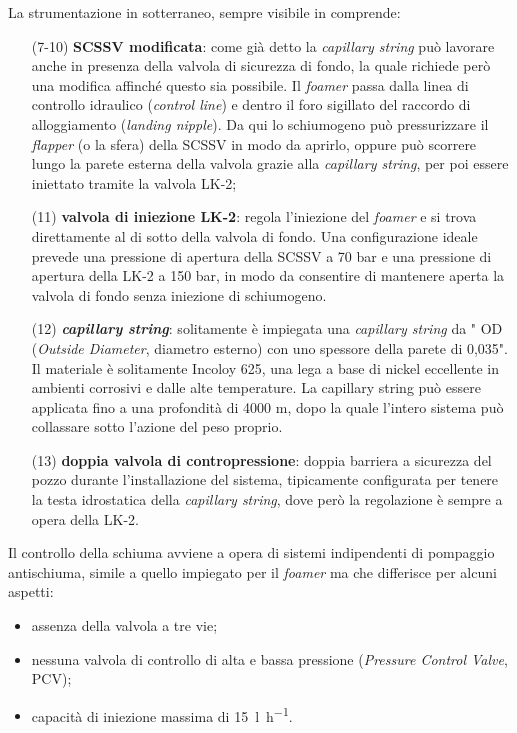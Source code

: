 La strumentazione in sotterraneo, sempre visibile in  comprende:
\begin{itemize}
    \item[(7-10)] \textbf{SCSSV modificata}: come già detto la \textit{capillary string} può lavorare anche in presenza della valvola di sicurezza di fondo, la quale richiede però una modifica affinché questo sia possibile. Il \textit{foamer} passa dalla linea di controllo idraulico (\textit{control line}) e dentro il foro sigillato del raccordo di alloggiamento (\textit{landing nipple}). Da qui lo schiumogeno può pressurizzare il \textit{flapper} (o la sfera) della SCSSV in modo da aprirlo, oppure può scorrere lungo la parete esterna della valvola grazie alla \textit{capillary string}, per poi essere iniettato tramite la valvola LK-2;
    \item[(11)] \textbf{valvola di iniezione LK-2}: regola l'iniezione del \textit{foamer} e si trova direttamente al di sotto della valvola di fondo. Una configurazione ideale prevede una pressione di apertura della SCSSV a 70 bar e una pressione di apertura della LK-2 a 150 bar, in modo da consentire di mantenere aperta la valvola di fondo senza iniezione di schiumogeno.
    \item[(12)] \textit{\textbf{capillary string}}: solitamente è impiegata una \textit{capillary string} da {}" OD (\textit{Outside Diameter}, diametro esterno) con uno spessore della parete di 0,035". Il materiale è solitamente Incoloy 625, una lega a base di nickel eccellente in ambienti corrosivi e dalle alte temperature. La capillary string può essere applicata fino a una profondità di 4000 m, dopo la quale l'intero sistema può collassare sotto l'azione del peso proprio.
    \item[(13)] \textbf{doppia valvola di contropressione}: doppia barriera a sicurezza del pozzo durante l'installazione del sistema, tipicamente configurata per tenere la testa idrostatica della \textit{capillary string}, dove però la regolazione è sempre a opera della LK-2.
\end{itemize}
Il controllo della schiuma avviene a opera di sistemi indipendenti di pompaggio antischiuma, simile a quello impiegato per il \textit{foamer} ma che differisce per alcuni aspetti:
\begin{itemize}
    \item assenza della valvola a tre vie;
    \item nessuna valvola di controllo di alta e bassa pressione (\textit{Pressure Control Valve}, PCV);
    \item capacità di iniezione massima di \SI{15}{\litre\per\hour}.
\end{itemize}
